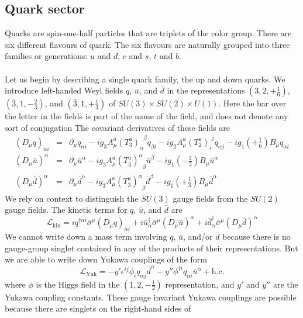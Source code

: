 \subsection{Quark sector}
Quarks are spin-one-half particles that are triplets of the color group. There are six different flavours of quark. The six flavours are naturally grouped into three families or generations: $u$ and $d$, $c$ and $s$, $t$ and $b$.
\\ \\
Let us begin by describing a single quark family, the up and down quarks. We introduce left-handed Weyl fields $q$, $\bar{u}$, and $\bar{d}$ in the representations
$(3,2,+\frac{1}{6})$, $(\bar{3},1,-\frac{2}{3})$, and $(\bar{3},1,+\frac{1}{3})$ of $SU(3) \times SU(2) \times U(1)$. 
Here the bar over the letter in the fields is part of the name of the field, and does not denote any sort of conjugation
The covariant derivatives of these fields are
\begin{eqnarray}
(D_{\mu}q)_{\alpha i} &=& \partial_{\mu}q_{\alpha i} - ig_3A^a_{\mu}(T^a_3)_{\alpha}^{\phantom{\alpha}\beta} q_{\beta i} - ig_2A^a_{\mu}(T^a_2)_{i}^{\phantom{j}j} q_{\alpha j} - ig_1(+\frac{1}{6})B_{\mu} q_{\alpha i}
\nonumber \\
(D_{\mu}\bar{u})^{\alpha} &=& \partial_{\mu}\bar{u}^{\alpha} -ig_3A^a_{\mu}(T^a_{\bar{3}})^{\alpha}_{\phantom{\alpha}\beta} \bar{u}^{\beta } - ig_1(-\frac{2}{3})B_{\mu}\bar{u}^{\alpha}
\nonumber \\
(D_{\mu}\bar{d})^{\alpha} &=& \partial_{\mu}\bar{d}^{\alpha} -ig_3A^a_{\mu}(T^a_{\bar{3}})^{\alpha}_{\phantom{\alpha}\beta} \bar{d}^{\beta } - ig_1(+\frac{1}{3})B_{\mu}\bar{d}^{\alpha}
\nonumber
\end{eqnarray}
We rely on context to distinguish the $SU(3)$ gauge fields from the $SU(2)$ gauge fields. The kinetic terms for $q$, $\bar{u}$, and $\bar{d}$ are
\[\mathcal{L}_{\mathrm{kin}} = iq^{\dagger \alpha i} \overline{\sigma}^{\mu} (D_{\mu}q)_{\alpha i} + i\bar{u}^{\dagger}_{\alpha}\overline{\sigma}^{\mu}(D_{\mu}\bar{u})^{\alpha} + i\bar{d}^{\dagger}_{\alpha}\overline{\sigma}^{\mu}(D_{\mu}\bar{d})^{\alpha}\]
We cannot write down a mass term involving $q$, $\bar{u}$, and/or $\bar{d}$ because there is no gauge-group singlet contained in any of the products of their representations. But we are able to write down Yukawa couplings of the form
\[\mathcal{L}_{\mathrm{Yuk}} = -y'\epsilon^{ij}\phi_i q_{\alpha j} \bar{d}^{\alpha} - y'' \phi^{\dagger i}q_{\alpha i} \bar{u}^{\alpha} + \mathrm{h.c.}\]
where $\phi$ is the Higgs field in the $(1,2,-\frac{1}{2})$ representation, and $y'$ and $y''$ are the Yukawa coupling constants. These gauge invariant Yukawa couplings are possible because there are singlets on the right-hand sides of
